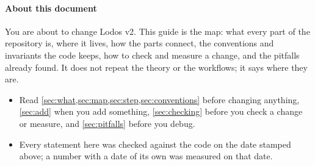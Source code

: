 



\paragraph{About this document}
You are about to change Lodos v2. This guide is the map: what every part of the repository is, where it lives, how the parts connect, the conventions and invariants the code keeps, how to check and measure a change, and the pitfalls already found. It does not repeat the theory or the workflows; it says where they are.

\begin{itemize}
\item Read \cref{sec:what,sec:map,sec:step,sec:conventions} before changing anything, \cref{sec:add} when you add something, \cref{sec:checking} before you check a change or measure, and \cref{sec:pitfalls} before you debug.
\item Every statement here was checked against the code on the date stamped above; a number with a date of its own was measured on that date.
\end{itemize}

